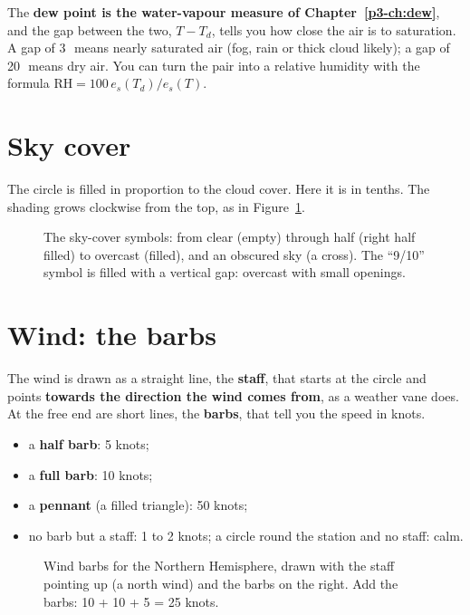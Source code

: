 The \textbf{dew point is the water-vapour measure of Chapter~\ref{p3-ch:dew}}, and the gap between the two, $T-T_d$, tells you how close the air is to saturation. A gap of 3\,\degF\ means nearly saturated air (fog, rain or thick cloud likely); a gap of 20\,\degF\ means dry air. You can turn the pair into a relative humidity with the formula $\mathrm{RH}=100\,e_s(T_d)/e_s(T)$.

\section{Sky cover}

The circle is filled in proportion to the cloud cover. Here it is in tenths. The shading grows clockwise from the top, as in Figure~\ref{p3-fig:sky}.

\begin{figure}[ht]
\centering
\begin{tikzpicture}[x=0.058cm,y=-0.058cm,line cap=round]\end{tikzpicture}
\caption{The sky-cover symbols: from clear (empty) through half (right half filled) to overcast (filled), and an obscured sky (a cross). The ``9/10'' symbol is filled with a vertical gap: overcast with small openings.}\label{p3-fig:sky}
\end{figure}

\section{Wind: the barbs}

The wind is drawn as a straight line, the \textbf{staff}, that starts at the circle and points \textbf{towards the direction the wind comes from}, as a weather vane does. At the free end are short lines, the \textbf{barbs}, that tell you the speed in knots.

\begin{itemize}
\item a \textbf{half barb}: 5 knots;
\item a \textbf{full barb}: 10 knots;
\item a \textbf{pennant} (a filled triangle): 50 knots;
\item no barb but a staff: 1 to 2 knots; a circle round the station and no staff: calm.
\end{itemize}

\begin{figure}[ht]
\centering
\begin{tikzpicture}[x=0.066cm,y=-0.066cm,line cap=round]\end{tikzpicture}
\caption{Wind barbs for the Northern Hemisphere, drawn with the staff pointing up (a north wind) and the barbs on the right. Add the barbs: 10 + 10 + 5 = 25 knots.}
\end{figure}

